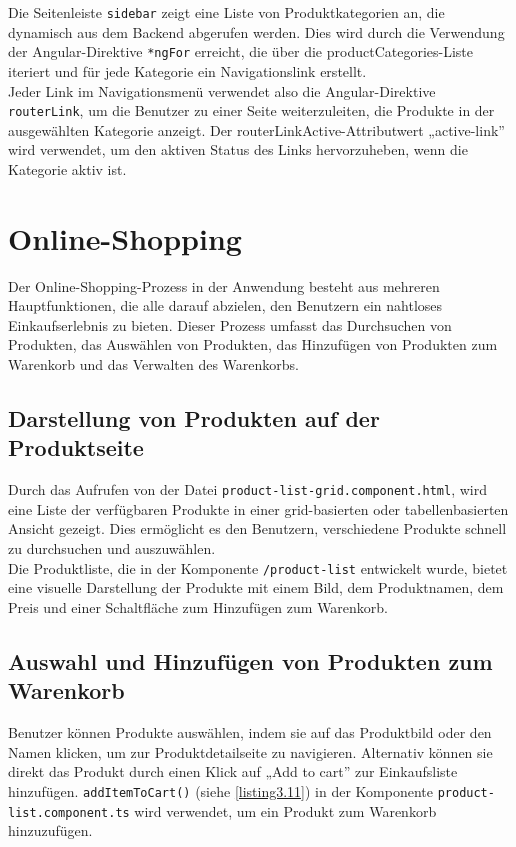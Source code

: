 Die Seitenleiste \verb*|sidebar| zeigt eine Liste von Produktkategorien an, die dynamisch aus dem Backend abgerufen werden. Dies wird durch die Verwendung der Angular-Direktive \verb*|*ngFor| erreicht, die über die productCategories-Liste iteriert und für jede Kategorie ein Navigationslink erstellt.\\
Jeder Link im Navigationsmenü verwendet also die Angular-Direktive \verb*|routerLink|, um die Benutzer zu einer Seite weiterzuleiten, die Produkte in der ausgewählten Kategorie anzeigt. Der routerLinkActive-Attributwert „active-link'' wird verwendet, um den aktiven Status des Links hervorzuheben, wenn die Kategorie aktiv ist.


\section{Online-Shopping}

Der Online-Shopping-Prozess in der Anwendung besteht aus mehreren Hauptfunktionen, die alle darauf abzielen, den Benutzern ein nahtloses Einkaufserlebnis zu bieten. Dieser Prozess umfasst das Durchsuchen von Produkten, das Auswählen von Produkten, das Hinzufügen von Produkten zum Warenkorb und das Verwalten des Warenkorbs.

\subsection{Darstellung von Produkten auf der Produktseite}

Durch das Aufrufen von der Datei \verb*|product-list-grid.component.html|, wird eine Liste der verfügbaren Produkte in einer grid-basierten oder tabellenbasierten Ansicht gezeigt. Dies ermöglicht es den Benutzern, verschiedene Produkte schnell zu durchsuchen und auszuwählen. \\
Die Produktliste, die in der Komponente \verb*|/product-list| entwickelt wurde, bietet eine visuelle Darstellung der Produkte mit einem Bild, dem Produktnamen, dem Preis und einer Schaltfläche zum Hinzufügen zum Warenkorb.

\subsection{Auswahl und Hinzufügen von Produkten zum Warenkorb}

Benutzer können Produkte auswählen, indem sie auf das Produktbild oder den Namen klicken, um zur Produktdetailseite zu navigieren. Alternativ können sie direkt das Produkt durch einen Klick auf „Add to cart'' zur Einkaufsliste hinzufügen. \verb*|addItemToCart()| (siehe \ref{listing3.11}) in der Komponente \verb*|product-list.component.ts| wird verwendet, um ein Produkt zum Warenkorb hinzuzufügen.

